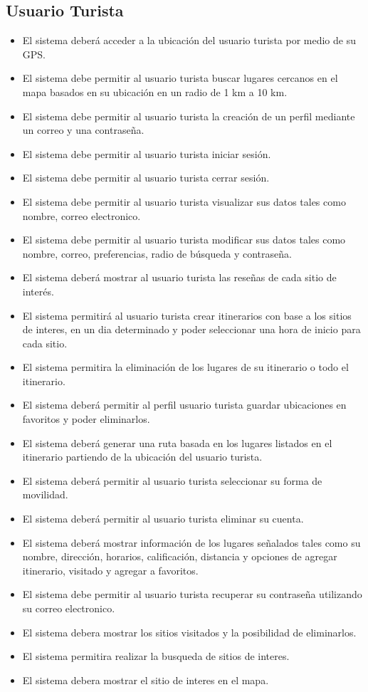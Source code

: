 \documentclass{article}
\begin{document}
\subsection{Usuario Turista}
\begin{itemize}
    \item El sistema deberá acceder a la ubicación del usuario turista por medio de su GPS.
    \item El sistema debe permitir al usuario turista buscar lugares cercanos en el mapa basados en su ubicación en un radio de 1 km a 10 km.
    \item El sistema debe permitir al usuario turista la creación de un perfil mediante un correo y una contraseña.
    \item El sistema debe permitir al usuario turista iniciar sesión.
    \item El sistema debe permitir al usuario turista cerrar sesión.
    \item El sistema debe permitir al usuario turista visualizar sus datos tales como nombre, correo electronico. 
    \item El sistema debe permitir al usuario turista modificar sus datos tales como nombre, correo, preferencias, radio de búsqueda y contraseña.
    \item El sistema deberá mostrar al usuario turista las reseñas de cada sitio de interés.
    \item El sistema permitirá al usuario turista crear itinerarios con base a los sitios de interes, en un dia determinado y poder seleccionar una hora de inicio para cada sitio.
    \item El sistema permitira la eliminación de los lugares de su itinerario o todo el itinerario.
    \item El sistema deberá permitir al perfil usuario turista guardar ubicaciones en favoritos y poder eliminarlos.
    \item El sistema deberá generar una ruta basada en los lugares listados en el itinerario partiendo de la ubicación del usuario turista.
    \item El sistema deberá permitir al usuario turista seleccionar su forma de movilidad.
    \item El sistema deberá permitir al usuario turista eliminar su cuenta.
    \item El sistema deberá mostrar información de los lugares señalados tales como su nombre, dirección, horarios, calificación, distancia y opciones de agregar itinerario, visitado y agregar a favoritos.
    \item El sistema debe permitir al usuario turista recuperar su contraseña utilizando su correo electronico.
    \item El sistema debera mostrar los sitios visitados y la posibilidad de eliminarlos.
    \item El sistema permitira realizar la busqueda de sitios de interes.
    \item El sistema debera mostrar el sitio de interes en el mapa.
\end{itemize}
\end{document}
